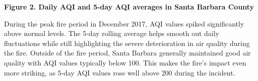 \documentclass[
  letterpaper,
  DIV=11,
  numbers=noendperiod]{scrartcl}
\begin{document}
\textbf{Figure 2. Daily AQI and 5-day AQI averages in Santa Barbara
County}

During the peak fire period in December 2017, AQI values spiked
significantly above normal levels. The 5-day rolling average helps
smooth out daily fluctuations while still highlighting the severe
deterioration in air quality during the fire. Outside of the fire
period, Santa Barbara generally maintained good air quality with AQI
values typically below 100. This makes the fire's impact even more
striking, as 5-day AQI values rose well above 200 during the incident.
\end{document}
